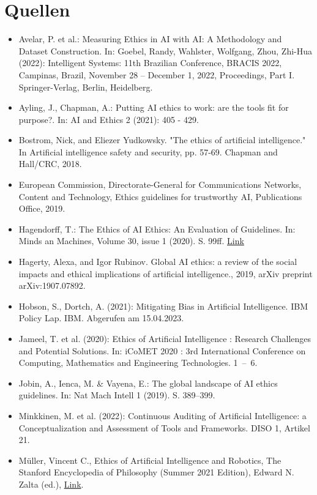 \section{Quellen}

\begin{itemize}
\item Avelar, P. et al.: Measuring Ethics in AI with AI: A Methodology and Dataset Construction. In: Goebel, Randy, Wahlster, Wolfgang, Zhou, Zhi-Hua (2022): Intelligent Systems: 11th Brazilian Conference, BRACIS 2022, Campinas, Brazil, November 28 – December 1, 2022, Proceedings, Part I. Springer-Verlag, Berlin, Heidelberg.
\item Ayling, J., Chapman, A.: Putting AI ethics to work: are the tools fit for purpose?. In: AI and Ethics 2 (2021): 405 - 429.
\item Bostrom, Nick, and Eliezer Yudkowsky. "The ethics of artificial intelligence." In Artificial intelligence safety and security, pp. 57-69. Chapman and Hall/CRC, 2018.
\item European Commission, Directorate-General for Communications Networks, Content and Technology, Ethics guidelines for trustworthy AI, Publications Office, 2019.
\item Hagendorff, T.: The Ethics of AI Ethics: An Evaluation of Guidelines. In: Minds an Machines, Volume 30, issue 1 (2020). S. 99ff. \href{https://link.springer.com/content/pdf/10.1007/s11023-020-09517-8.pdf}{Link}
\item Hagerty, Alexa, and Igor Rubinov. Global AI ethics: a review of the social impacts and ethical implications of artificial intelligence.,  2019, arXiv preprint arXiv:1907.07892.
\item Hobson, S., Dortch, A. (2021): Mitigating Bias in Artificial Intelligence. IBM Policy Lap. IBM. Abgerufen am 15.04.2023.
\item Jameel, T. et al. (2020): Ethics of Artificial Intelligence : Research Challenges and Potential Solutions. In: iCoMET 2020 : 3rd International Conference on Computing, Mathematics and Engineering Technologies. 1 – 6.
\item Jobin, A., Ienca, M. \& Vayena, E.: The global landscape of AI ethics guidelines. In: Nat Mach Intell 1 (2019). S. 389–399.
\item Minkkinen, M. et al. (2022): Continuous Auditing of Artificial Intelligence: a Conceptualization and Assessment of Tools and Frameworks. DISO 1, Artikel 21.
\item Müller, Vincent C., Ethics of Artificial Intelligence and Robotics, The Stanford Encyclopedia of Philosophy (Summer 2021 Edition), Edward N. Zalta (ed.), \href{https://plato.stanford.edu/archives/sum2021/entries/ethics-ai/}{Link}.

\end{itemize}
